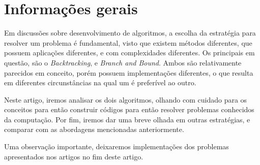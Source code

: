 \section{Informações gerais}

Em discussões sobre desenvolvimento de algoritmos, a escolha da estratégia para 
resolver um problema é fundamental, visto que existem métodos diferentes, que 
possuem aplicações diferentes, e com complexidades diferentes. Os principais
em questão, são o \emph{Backtracking}, e \emph{Branch and Bound}. Ambos são relativamente
parecidos em conceito, porém possuem implementações diferentes, o que resulta em diferentes
circunstâncias na qual um é preferível ao outro.

Neste artigo, iremos analisar os dois algoritmos, olhando com cuidado para os conceitos 
para então construir códigos para então resolver problemas conhecidos da computação. Por fim, 
iremos dar uma breve olhada em outras estratégias, e comparar com as abordagens mencionadas anteriormente.

Uma observação importante, deixaremos implementações dos problemas apresentados nos artigos no fim 
deste artigo.